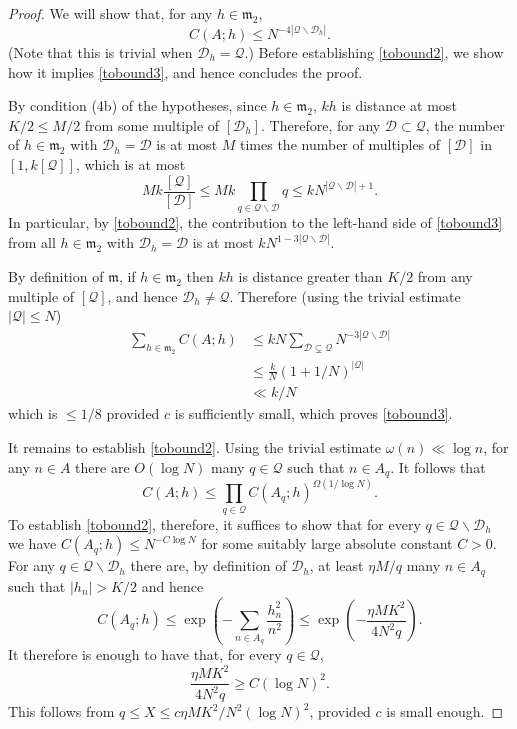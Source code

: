 \documentclass{amsart}
\newcommand{\abs}[1]{\left\lvert #1\right\rvert}
\newcommand{\brac}[1]{\left( #1\right)}
\begin{document}
\begin{proof}
We will show that, for any $h\in\mathfrak{m}_2$,
\begin{equation}\label{tobound2}
C(A;h)\leq N^{-4\abs{\mathcal{Q}\backslash\mathcal{D}_h}}.
\end{equation}
(Note that this is trivial when $\mathcal{D}_h=\mathcal{Q}$.) Before establishing \eqref{tobound2}, we show how it implies \eqref{tobound3}, and hence concludes the proof.

By condition (4b) of the hypotheses, since $h\in\mathfrak{m}_2$, $kh$ is distance at most $K/2\leq M/2$ from some multiple of $[\mathcal{D}_h]$. Therefore, for any $\mathcal{D}\subset \mathcal{Q}$, the number of $h\in\mathfrak{m}_2$ with $\mathcal{D}_h=\mathcal{D}$ is at most $M$ times the number of multiples of $[\mathcal{D}]$ in $[1,k[\mathcal{Q}]]$, which is at most
\[Mk\frac{[\mathcal{Q}]}{[\mathcal{D}]} \leq Mk\prod_{q\in\mathcal{Q}\backslash\mathcal{D}}q\leq kN^{\abs{\mathcal{Q}\backslash \mathcal{D}}+1}.\]
In particular, by \eqref{tobound2}, the contribution to the left-hand side of \eqref{tobound3} from all $h\in\mathfrak{m}_2$ with $\mathcal{D}_h=\mathcal{D}$ is at most $kN^{1-3\abs{\mathcal{Q}\backslash \mathcal{D}}}$. 

By definition of $\mathfrak{m}$, if $h\in\mathfrak{m}_2$ then $kh$ is distance greater than $K/2$ from any multiple of $[\mathcal{Q}]$, and hence $\mathcal{D}_h\neq \mathcal{Q}$. Therefore (using the trivial estimate $\abs{\mathcal{Q}}\leq N$)
\begin{align*}
\sum_{h\in\mathfrak{m}_2}C(A;h)
&\leq
kN\sum_{\mathcal{D}\subsetneq \mathcal{Q}}N^{-3\abs{\mathcal{Q}\backslash \mathcal{D}}}\\
&\leq \frac{k}{N}(1+1/N)^{\abs{\mathcal{Q}}}\\
&\ll k/N
\end{align*}
which is $\leq 1/8$ provided $c$ is sufficiently small, which proves \eqref{tobound3}.

It remains to establish \eqref{tobound2}. Using the trivial estimate $\omega(n)\ll \log n$, for any $n\in A$ there are $O(\log N)$ many $q\in\mathcal{Q}$ such that $n\in A_q$. It follows that 
 \[C(A;h)\leq \prod_{q\in \mathcal{Q}}C(A_q;h)^{\Omega(1/\log N)}.\]
To establish \eqref{tobound2}, therefore, it suffices to show that for every $q\in\mathcal{Q}\backslash\mathcal{D}_h$ we have $C(A_q;h)\leq N^{-C\log N}$ for some suitably large absolute constant $C>0$. 
 For any $q\in\mathcal{Q}\backslash \mathcal{D}_h$ there are, by definition of $\mathcal{D}_h$, at least $\eta M/q$ many $n\in A_q$ such that $\abs{h_n}>K/2$ and hence
\[C(A_q;h)\leq\exp\brac{-\sum_{n\in A_q}\frac{h_n^2}{n^2}}\leq \exp\brac{-\frac{\eta MK^2}{4N^2q}}.\] 
It therefore is enough to have that, for every $q\in\mathcal{Q}$, 
\[\frac{\eta MK^2}{4N^2q}\geq C(\log N)^2.\]
This follows from $q\leq X\leq c\eta MK^2/N^2(\log N)^2$, provided $c$ is small enough.
\end{proof}
\end{document}
